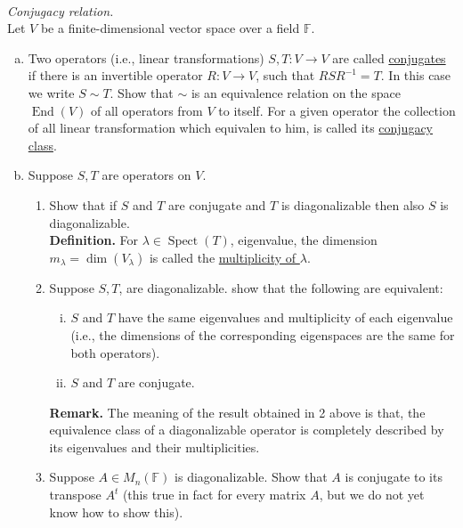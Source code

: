 \documentclass{article}
\begin{document}
\begin{problem} \\ 
    \textit{Conjugacy relation.} \\
    Let $V$ be a finite-dimensional vector space over a field $\mathbb{F}$.
    \begin{enumerate}[(a)]
        \item Two operators (i.e., linear transformations) $S,T : V \to V$ are called \underline{conjugates} if there is an invertible operator $R : V \to V$, such that $RSR^{-1} = T$. In this case we write $S \sim T$. Show that $\sim$ is an equivalence relation on the space $\operatorname{End}(V)$ of all operators from $V$ to itself. For a given operator the collection of all linear transformation which equivalen to him, is called its \underline{conjugacy class}.
        \item Suppose $S,T$ are operators on $V$.
        \begin{enumerate}[1.]
            \item Show that if $S$ and $T$ are conjugate and $T$ is diagonalizable then also $S$ is diagonalizable. \\
            \textbf{Definition.} For $\lambda \in \operatorname{Spect}(T)$, eigenvalue, the dimension $m_\lambda = \dim(V_\lambda)$ is called the \underline{multiplicity of $\lambda$}.
            \item Suppose $S, T$, are diagonalizable. show that the following are equivalent:
            \begin{enumerate}[i)]
                \item $S$ and $T$ have the same eigenvalues and multiplicity of each eigenvalue (i.e., the dimensions of the corresponding eigenspaces are the same for both operators).
                \item $S$ and $T$ are conjugate.
            \end{enumerate}
            \textbf{Remark.} The meaning of the result obtained in 2 above is that, the equivalence class of a diagonalizable operator is completely described by its eigenvalues and their multiplicities.
            \item Suppose $A \in M_n(\mathbb{F})$ is diagonalizable. Show that $A$ is conjugate to its transpose $A^t$ (this true in fact for every matrix $A$, but we do not yet know how to show this).
        \end{enumerate}
    \end{enumerate}
\end{problem}
\end{document}

